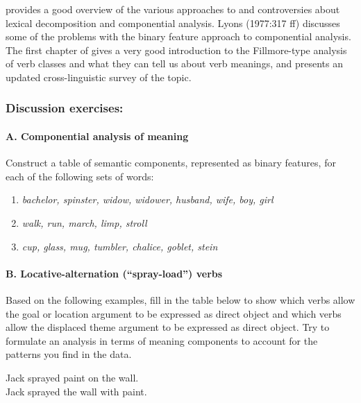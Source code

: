 \furtherreading



\citet{Engelberg2011} provides a good overview of the various approaches to and controversies about lexical decomposition and componential analysis. Lyons (1977:317 ff) discusses some of the problems with the binary feature approach to componential analysis. The first chapter of \citet{Levin1993} gives a very good introduction to the Fillmore-type analysis of verb classes and what they can tell us about verb meanings, and \citet{Levin2015} presents an updated cross-linguistic survey of the topic. 


\subsubsection{Discussion exercises:}\label{sec:}
\paragraph{A.  Componential analysis of meaning}

Construct a table of semantic components, represented as binary features, for each of the following sets of words:

\begin{enumerate}
\item \itshape
bachelor, spinster, widow, widower, husband, wife, boy, girl
\item \itshape
walk, run, march, limp, stroll
\item \itshape
cup, glass, mug, tumbler, chalice, goblet, stein
\end{enumerate}

\paragraph{B.  Locative-alternation (“spray-load”) verbs}\footnotemark{}

Based on the following examples, fill in the table below to show which verbs allow the goal or location argument to be expressed as direct object and which verbs allow the displaced theme argument to be expressed as direct object. Try to formulate an analysis in terms of meaning components to account for the patterns you find in the data.

\ea
\label{ex:key:1}
\ea%
Jack sprayed paint on the wall.\\
\ex Jack sprayed the wall with paint.
    \z
\z

